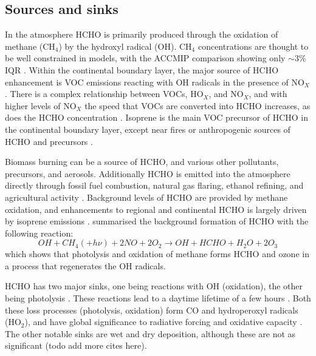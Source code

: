   \subsection{Sources and sinks}
    In the atmosphere HCHO is primarily produced through the oxidation of methane (CH$_4$) by the hydroxyl radical (OH).
    CH$_4$ concentrations are thought to be well constrained in models, with the ACCMIP comparison showing only $\sim3$\% IQR \citep{Young2013}.
    Within the continental boundary layer, the major source of HCHO enhancement is VOC emissions reacting with OH radicals in the presence of NO$_X$ \citep{Wagner2002, Millet2006}.
    There is a complex relationship between VOCs, HO$_X$, and NO$_X$, and with higher levels of NO$_X$ the speed that VOCs are converted into HCHO increases, as does the HCHO concentration \citep{Wolfe2016}.
    Isoprene is the main VOC precursor of HCHO in the continental boundary layer, except near fires or anthropogenic sources of HCHO and precursors \citep{Guenther1995, Wolfe2016}.
    
    Biomass burning can be a source of HCHO, and various other pollutants, precursors, and aerosols.
    Additionally HCHO is emitted into the atmosphere directly through fossil fuel combustion, natural gas flaring, ethanol refining, and agricultural activity \citep{Wolfe2016}.
    Background levels of HCHO are provided by methane oxidation, and enhancements to regional and continental HCHO is largely driven by isoprene emissions \citep{Guenther1995, Palmer2003, Shim2005}.
    \citet{Atkinson2000} summarised the background formation of HCHO with the following reaction:
    \begin{equation} \label{ch_LitRev:eqn:MethaneBackground}
      OH + CH_4 (+ h\nu) + 2NO + 2O_2 \rightarrow OH + HCHO + H_2O + 2O_3
    \end{equation}
    which shows that photolysis and oxidation of methane forms HCHO and ozone in a process that regenerates the OH radicals.
    
    HCHO has two major sinks, one being reactions with OH (oxidation), the other being photolysis \citep{Crutzen1999, Wagner2002, Levy1972}.
    These reactions lead to a daytime lifetime of a few hours \citep{Atkinson2000, Millet2006}.
    Both these loss processes (photolysis, oxidation) form CO and hydroperoxyl radicals (HO$_2$), and have global significance to radiative forcing and oxidative capacity \citep{Franco2015}.
    The other notable sinks are wet and dry deposition, although these are not as significant \citep{Atkinson2000} (todo add more cites here).
    
